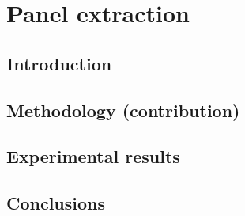 \chapter{Panel extraction}
\label{chap:pe}
\graphicspath{{./chapters/4-pe/figs/}}

\section{Introduction}
\label{sec:pe:introduction}

\section{Methodology (contribution)}
\label{sec:pe:methodology}

\section{Experimental results}
\label{sec:pe:experimental_results}


\section{Conclusions}
\label{sec:pe:conclusion}
